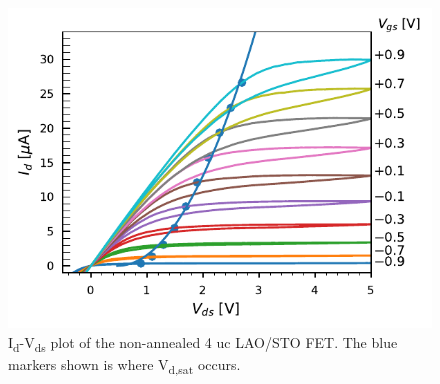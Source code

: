 \documentclass[11pt,a4paper]{report}
\begin{document}
\begin{figure}[!h]
    \centering
    \includegraphics[scale=1]{Figures/Batch1/Dev16_Vds_sweep-Ids.pdf}
    \caption{I\textsubscript{d}-V\textsubscript{ds} plot of the non-annealed 4 uc LAO/STO FET. The blue markers shown is where V\textsubscript{d,sat} occurs.}
    \label{fig:Appendix-Id Vs Vds dev16}
\end{figure}
\end{document}
